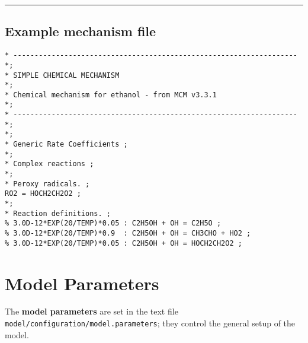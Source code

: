\begin{center}\rule{0.5\linewidth}{\linethickness}\end{center}

\subsection{Example mechanism file} \label{example-mechanism-file}

\begin{verbatim}
* ------------------------------------------------------------------- *;
* SIMPLE CHEMICAL MECHANISM                                           *;
* Chemical mechanism for ethanol - from MCM v3.3.1                    *;
* ------------------------------------------------------------------- *;
*;
* Generic Rate Coefficients ;
*;
* Complex reactions ;
*;
* Peroxy radicals. ;
RO2 = HOCH2CH2O2 ;
*;
* Reaction definitions. ;
% 3.0D-12*EXP(20/TEMP)*0.05 : C2H5OH + OH = C2H5O ;
% 3.0D-12*EXP(20/TEMP)*0.9  : C2H5OH + OH = CH3CHO + HO2 ;
% 3.0D-12*EXP(20/TEMP)*0.05 : C2H5OH + OH = HOCH2CH2O2 ;
\end{verbatim}

\section{Model Parameters} \label{sec:parameters}

The \textbf{model parameters} are set in the text file
\texttt{model/configuration/model.parameters}; they control the general
setup of the model.

